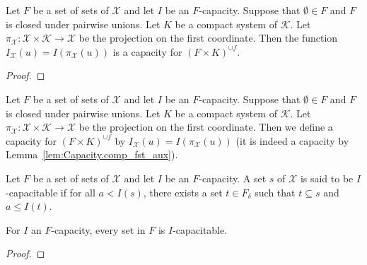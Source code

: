 \begin{lemma}\label{lem:Capacity.comp_fst_aux}
  \leanok
Let $F$ be a set of sets of $\mathcal{X}$ and let $I$ be an $F$-capacity.
Suppose that $\emptyset \in F$ and $F$ is closed under pairwise unions.
Let $K$ be a compact system of $\mathcal{K}$.
Let $\pi_{\mathcal{X}} : \mathcal{X} \times \mathcal{K} \to \mathcal{X}$ be the projection on the first coordinate.
Then the function $I_{\mathcal{X}}(u) = I(\pi_{\mathcal{X}}(u))$ is a capacity for $(F \times K)^{\cup f}$.
\end{lemma}

\begin{proof}\leanok

\end{proof}


\begin{definition}\label{def:Capacity.comp_fst}
  \leanok
Let $F$ be a set of sets of $\mathcal{X}$ and let $I$ be an $F$-capacity.
Suppose that $\emptyset \in F$ and $F$ is closed under pairwise unions.
Let $K$ be a compact system of $\mathcal{K}$.
Let $\pi_{\mathcal{X}} : \mathcal{X} \times \mathcal{K} \to \mathcal{X}$ be the projection on the first coordinate.
Then we define a capacity for $(F \times K)^{\cup f}$ by $I_{\mathcal{X}}(u) = I(\pi_{\mathcal{X}}(u))$ (it is indeed a capacity by Lemma~\ref{lem:Capacity.comp_fst_aux}).
\end{definition}


\begin{definition}\label{def:IsCapacitable}
  \leanok
Let $F$ be a set of sets of $\mathcal{X}$ and let $I$ be an $F$-capacity.
A set $s$ of $\mathcal{X}$ is said to be $I$-capacitable if for all $a < I(s)$, there exists a set $t \in F_\delta$ such that $t \subseteq s$ and $a \le I(t)$.
\end{definition}


\begin{lemma}\label{lem:isCapacitable_of_prop}
  \leanok
For $I$ an $F$-capacity, every set in $F$ is $I$-capacitable.
\end{lemma}

\begin{proof}\leanok

\end{proof}


